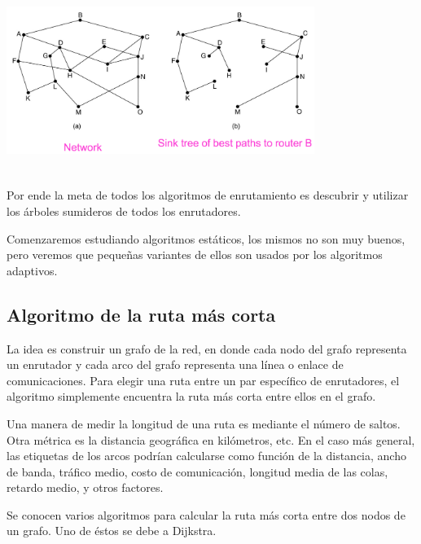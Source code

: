 	\begin{center}
		\includegraphics[width=10cm, height=6cm]{./imagenes/optimalidad.png}
	\end{center}

	\par Por ende la meta de todos los algoritmos de enrutamiento es descubrir y utilizar 
	los árboles sumideros de todos los enrutadores.
	
	\par Comenzaremos estudiando algoritmos estáticos, los mismos no son muy 
	buenos, pero veremos que pequeñas variantes de ellos son usados por los algoritmos 
	adaptivos.

\subsection{Algoritmo de la ruta más corta}
	\par La idea es construir un grafo de la red, en donde cada nodo del grafo 
	representa un enrutador y cada arco del grafo representa una línea o enlace de 
	comunicaciones. Para elegir una ruta entre un par específico de enrutadores, el 
	algoritmo simplemente encuentra la ruta más corta entre ellos en el grafo.

	\par Una manera de medir la longitud de una ruta es mediante el número de saltos. 
	Otra métrica es la distancia geográfica en kilómetros, etc. En el caso más general, las 
	etiquetas de los arcos podrían calcularse como función de la distancia, ancho de 
	banda, tráfico medio, costo de comunicación, longitud media de las colas, retardo 
	medio, y otros factores.

	\par Se conocen varios algoritmos para calcular la ruta más corta entre dos nodos de 
	un grafo. Uno de éstos se debe a Dijkstra.


